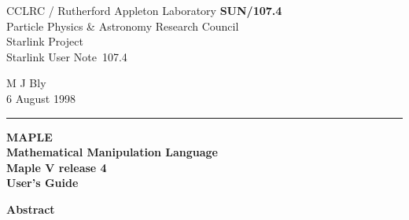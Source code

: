 \documentclass[twoside,11pt]{article}
\newcommand{\stardoccategory}  {Starlink User Note}
\newcommand{\stardocinitials}  {SUN}
\newcommand{\stardocnumber}    {107.4}
\newcommand{\stardocauthors}   {M J Bly}
\newcommand{\stardocdate}      {6 August 1998}
\newcommand{\stardoctitle}     {MAPLE \\[2ex]
                                Mathematical Manipulation Language}
\newcommand{\stardocversion}   {Maple V release 4}
\newcommand{\stardocmanual}    {User's Guide}
\newcommand{\stardocname}{\stardocinitials /\stardocnumber}
\newenvironment{latexonly}{}{}
\begin{document}
\thispagestyle{empty}

\begin{latexonly}
   CCLRC / {\sc Rutherford Appleton Laboratory} \hfill {\bf \stardocname}\\
   {\large Particle Physics \& Astronomy Research Council}\\
   {\large Starlink Project\\}
   {\large \stardoccategory\ \stardocnumber}
   \begin{flushright}
   \stardocauthors\\
   \stardocdate
   \end{flushright}
   \vspace{-4mm}
   \rule{\textwidth}{0.5mm}
   \vspace{5mm}
   \begin{center}
   {\Huge\bf  \stardoctitle \\ [2.5ex]}
   {\LARGE\bf \stardocversion \\ [4ex]}
   {\Huge\bf  \stardocmanual}
   \end{center}
   \vspace{5mm}


   \vspace{10mm}
   \begin{center}
      {\Large\bf Abstract}
   \end{center}
\end{latexonly}
\end{document}
